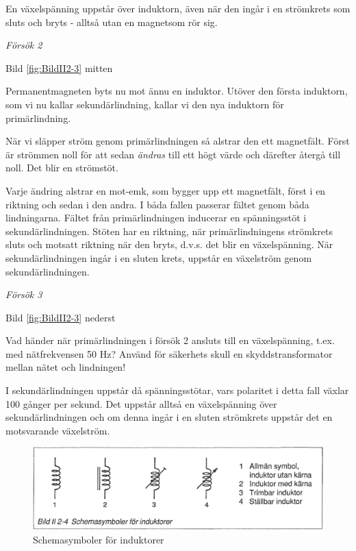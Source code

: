 En växelspänning uppstår över induktorn, även när den ingår i en strömkrets som
sluts och bryts - alltså utan en magnetsom rör sig.

\emph{Försök 2}

Bild \ref{fig:BildII2-3} mitten

Permanentmagneten byts nu mot ännu en induktor. Utöver den första induktorn, som
vi nu kallar sekundärlindning, kallar vi den nya induktorn för primärlindning.

När vi släpper ström genom primärlindningen så alstrar den ett magnetfält. Först
är strömmen noll för att sedan \emph{ändras} till ett högt värde och därefter
återgå till noll. Det blir en strömstöt.

Varje ändring alstrar en mot-emk, som bygger upp ett magnetfält, först i en
riktning och sedan i den andra. I båda fallen passerar fältet genom båda
lindningarna. Fältet från primärlindningen inducerar en spänningsstöt i
sekundärlindningen. Stöten har en riktning, när primärlindningens strömkrets
sluts och motsatt riktning när den bryts, d.v.s. det blir en växelspänning.
När sekundärlindningen ingår i en sluten krets, uppstår en växelström genom
sekundärlindningen.

\emph{Försök 3}


Bild \ref{fig:BildII2-3} nederst

Vad händer när primärlindningen i försök 2 ansluts till en växelspänning, t.ex.
med nätfrekvensen 50 Hz? Använd för säkerhets skull en skyddstransformator
mellan nätet och lindningen!

I sekundärlindningen uppstår då spänningsstötar, vars polaritet i detta fall
växlar 100 gånger per sekund. Det uppstår alltså en växelspänning över
sekundärlindningen och om denna ingår i en sluten strömkrets uppstår det en
motsvarande växelström.


\begin{figure}
\begin{center}
\includegraphics[width=14cm]{images/bild_2_2-04}
\caption{Schemasymboler för induktorer}
\label{fig:BildII2-4}
\end{center}
\end{figure}

